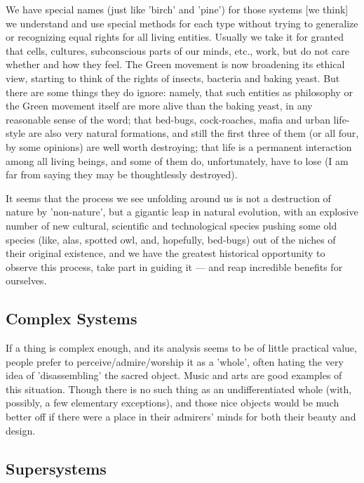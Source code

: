      We have special names (just like 'birch' and  'pine')  for  those
systems [we think] we understand and use special methods for each type
without trying to generalize  or  recognizing  equal  rights  for  all
living entities.  Usually we take it for granted that cells, cultures,
subconscious parts of our minds, etc., work, but do not  care  whether
and  how  they feel.  The Green movement is now broadening its ethical
view, starting to think of the rights of insects, bacteria and  baking
yeast.   But  there are some things they do ignore:  namely, that such
entities as philosophy or the Green movement  itself  are  more  alive
than  the  baking  yeast,  in  any  reasonable sense of the word; that
bed-bugs, cock-roaches, mafia  and  urban  life-style  are  also  very
natural formations, and still the first three of them (or all four, by
some opinions) are well worth destroying; that  life  is  a  permanent
interaction   among   all   living   beings,  and  some  of  them  do,
unfortunately, have to  lose  (I  am  far  from  saying  they  may  be
thoughtlessly destroyed).

     It seems that the process we see unfolding around  us  is  not  a
destruction  of nature by 'non-nature', but a gigantic leap in natural
evolution, with an explosive number of new  cultural,  scientific  and
technological  species  pushing  some old species (like, alas, spotted
owl, and, hopefully, bed-bugs) out of the  niches  of  their  original
existence,  and we have the greatest historical opportunity to observe
this process, take part in guiding it --- and reap  incredible  benefits
for ourselves.



\subsection{Complex Systems}

     If a thing is complex enough, and its analysis  seems  to  be  of
little practical value, people prefer to perceive/admire/worship it as
a 'whole', often hating the very idea of  'disassembling'  the  sacred
object.   Music  and arts are good examples of this situation.  Though
there is no such thing as an undifferentiated whole (with, possibly, a
few  elementary  exceptions),  and  those  nice  objects would be much
better off if there were a place in their  admirers'  minds  for  both
their beauty and design.



\subsection{Supersystems}

